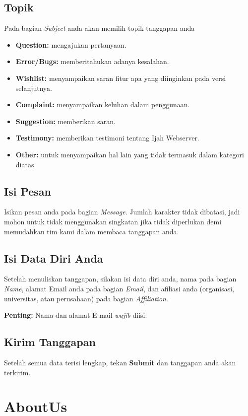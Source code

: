 	\subsection{Topik} \label{subject}
	Pada bagian \emph{Subject} anda akan memilih topik tanggapan anda 
	\begin{itemize}
	\item \textbf{Question:} mengajukan pertanyaan.
	\item \textbf{Error/Bugs:} memberitahukan adanya kesalahan.
	\item \textbf{Wishlist:} menyampaikan saran fitur apa yang diinginkan pada versi selanjutnya.
	\item \textbf{Complaint:} menyampaikan keluhan dalam penggunaan.
	\item \textbf{Suggestion:} memberikan saran.
	\item \textbf{Testimony:} memberikan testimoni tentang Ijah Webserver.
	\item \textbf{Other:} untuk menyampaikan hal lain yang tidak termasuk dalam kategori diatas.
	\end{itemize}

	\subsection{Isi Pesan} \label{message}
	Isikan pesan anda pada bagian \emph{Message}. Jumlah karakter tidak dibatasi, jadi mohon untuk tidak menggunakan singkatan jika tidak diperlukan demi memudahkan tim kami dalam membaca tanggapan anda. 


	\subsection{Isi Data Diri Anda} \label{personal data}
	Setelah menuliskan tanggapan, silakan isi data diri anda, nama pada bagian \emph{Name}, alamat E\-mail anda pada bagian \emph{E\-mail}, dan afiliasi anda (organisasi, universitas, atau perusahaan) pada bagian \emph{Affiliation}.

	\textbf{Penting:} Nama dan alamat E-mail \emph{wajib} diisi. 

	\subsection{Kirim Tanggapan} \label{submit}
	Setelah semua data terisi lengkap, tekan \textbf{Submit} dan tanggapan anda akan terkirim.

\section{AboutUs}


